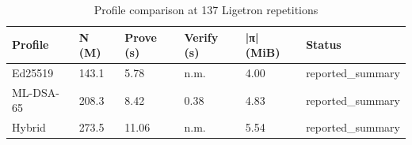 \begin{table}[t]
\centering
\caption{Profile comparison at 137 Ligetron repetitions}
\begin{tabular}{llllll}
\hline
Profile & N (M) & Prove (s) & Verify (s) & |π| (MiB) & Status \\
\hline
Ed25519 & 143.1 & 5.78 & n.m. & 4.00 & reported\_summary \\
ML-DSA-65 & 208.3 & 8.42 & 0.38 & 4.83 & reported\_summary \\
Hybrid & 273.5 & 11.06 & n.m. & 5.54 & reported\_summary \\
\hline
\end{tabular}
\end{table}
